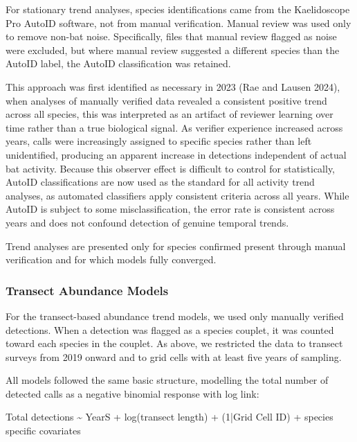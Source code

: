 \documentclass[
  letterpaper,
  DIV=11,
  numbers=noendperiod]{scrartcl}
\newenvironment{Shaded}{\begin{snugshade}}{\end{snugshade}}
\newcommand{\DecValTok}[1]{\textcolor[rgb]{0.68,0.00,0.00}{#1}}
\newcommand{\FunctionTok}[1]{\textcolor[rgb]{0.28,0.35,0.67}{#1}}
\newcommand{\NormalTok}[1]{\textcolor[rgb]{0.00,0.23,0.31}{#1}}
\newcommand{\SpecialCharTok}[1]{\textcolor[rgb]{0.37,0.37,0.37}{#1}}
\begin{document}
For stationary trend analyses, species identifications came from the
Kaelidoscope Pro AutoID software, not from manual verification. Manual
review was used only to remove non-bat noise. Specifically, files that
manual review flagged as noise were excluded, but where manual review
suggested a different species than the AutoID label, the AutoID
classification was retained.

This approach was first identified as necessary in 2023 (Rae and Lausen
2024), when analyses of manually verified data revealed a consistent
positive trend across all species, this was interpreted as an artifact
of reviewer learning over time rather than a true biological signal. As
verifier experience increased across years, calls were increasingly
assigned to specific species rather than left unidentified, producing an
apparent increase in detections independent of actual bat activity.
Because this observer effect is difficult to control for statistically,
AutoID classifications are now used as the standard for all activity
trend analyses, as automated classifiers apply consistent criteria
across all years. While AutoID is subject to some misclassification, the
error rate is consistent across years and does not confound detection of
genuine temporal trends.

Trend analyses are presented only for species confirmed present through
manual verification and for which models fully converged.

\subsubsection{Transect Abundance
Models}\label{transect-abundance-models}

For the transect-based abundance trend models, we used only manually
verified detections. When a detection was flagged as a species couplet,
it was counted toward each species in the couplet. As above, we
restricted the data to transect surveys from 2019 onward and to grid
cells with at least five years of sampling.

All models followed the same basic structure, modelling the total number
of detected calls as a negative binomial response with log link:

\begin{Shaded}
\begin{Highlighting}[]
\NormalTok{Total detections }\SpecialCharTok{\textasciitilde{}}\NormalTok{ YearS }\SpecialCharTok{+} \FunctionTok{log}\NormalTok{(transect length) }\SpecialCharTok{+}\NormalTok{ (}\DecValTok{1}\SpecialCharTok{|}\NormalTok{Grid Cell ID) }
\SpecialCharTok{+}\NormalTok{ species specific covariates}
\end{Highlighting}
\end{Shaded}
\end{document}
